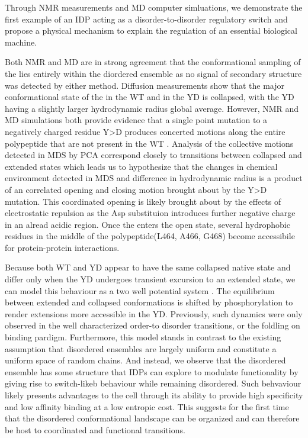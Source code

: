 Through NMR measurements and MD computer simluations, we demonstrate the first example of an IDP acting as a disorder-to-disorder regulatory switch and propose a physical mechanism to explain the regulation of an essential biological machine. 

Both NMR and MD are in strong agreement that the conformational sampling of the \gct{} lies entirely within the diordered ensemble as no signal of secondary structure was detected by either method. Diffusion measurements show that the major conformational state of the \gct{} in the WT and in the YD is collapsed, with the YD having a slightly larger hydrodynamic radius global average. However, NMR and MD simulations both provide evidence that a single point mutation to a negatively charged residue Y>D produces concerted motions along the entire polypeptide that are not present in the WT \gct{}. Analysis of the collective motions detected in MDS by PCA correspond closely to transitions between collapsed and extended states which leads us to hypothesize that the changes in chemical environment detected in MDS and difference in hydrodynamic radius is a product of an correlated opening and closing motion brought about by the Y>D mutation. This coordinated opening is likely brought about by the effects of electrostatic repulsion as the Asp substituion introduces further negative charge in an alread acidic region. Once the \gct{} enters the open state, several hydrophobic residues in the middle of the polypeptide(L464, A466, G468) become accessibile for protein-protein interactions.

 Because both WT and YD appear to have the same collapsed native state and differ only when the YD undergoes transient excursion to an extended state, we can model this behaviour as a two well potential system . The equilibrium between extended and collapsed conformations is shifted by phosphorylation to render extensions more accessible in the YD.  Previously, such dynamics were only observed in the well characterized order-to disorder transitions, or the foldling on binding pardigm. Furthermore, this model stands in contrast to the existing assumption that disordered ensembles are largely uniform  and constitute a uniform space of random chains. And instead, we observe that the disordered ensemble has some structure that IDPs can explore to modulate functionality by giving rise to switch-likeb behaviour while remaining disordered. Such behvaviour likely presents advantages to the cell through its ability to provide high specificity and low affinity binding at a low entropic cost. This suggests for the first time that the disordered conformational landscape can be organized and can therefore be host to coordinated and functional transitions.

